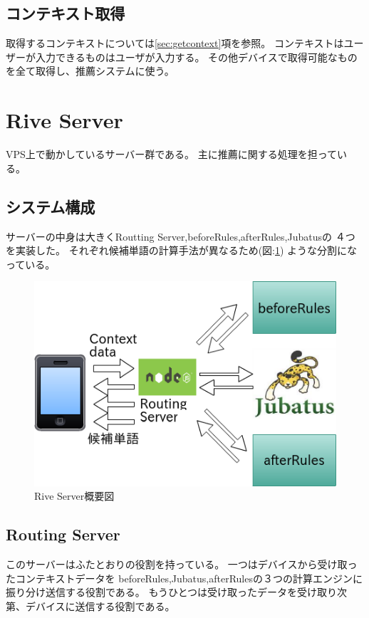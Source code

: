 \subsection{コンテキスト取得}
取得するコンテキストについては\ref{sec:getcontext}項を参照。
コンテキストはユーザーが入力できるものはユーザが入力する。
その他デバイスで取得可能なものを全て取得し、推薦システムに使う。

\section{Rive Server}
VPS上で動かしているサーバー群である。
主に推薦に関する処理を担っている。

\subsection{システム構成}
サーバーの中身は大きくRoutting Server,beforeRules,afterRules,Jubatusの
４つを実装した。
それぞれ候補単語の計算手法が異なるため(図:\ref{fig:riveserver})
ような分割になっている。
\begin{figure}[htbp]
  \begin{center}
    \includegraphics[width=14cm,bb=0 0 466 316]{images/riveserver.png}
  \end{center}
  \caption{Rive Server概要図}
  \label{fig:riveserver}
\end{figure}

\subsection{Routing Server}
このサーバーはふたとおりの役割を持っている。
一つはデバイスから受け取ったコンテキストデータを
beforeRules,Jubatus,afterRulesの３つの計算エンジンに振り分け送信する役割である。
もうひとつは受け取ったデータを受け取り次第、デバイスに送信する役割である。

